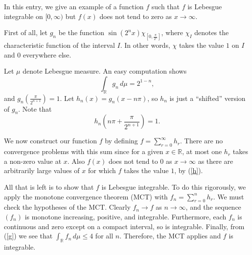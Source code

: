 \documentclass[12pt]{article}
\begin{document}

In this entry, we give an example of a function $f$ such that $f$ is Lebesgue integrable on $[0, \infty)$ but $f(x)$ does not tend to zero as $x \rightarrow \infty$.

First of all, let $g_n$ be the function $\displaystyle \sin (2^n x) \chi _{[0, \frac{\pi}{2^n}]}$, where $\chi _I$ denotes the characteristic function of the interval $I$.  In other words, $\chi$ takes the value $1$ on $I$ and 0 everywhere else.

Let $\mu$ denote Lebesgue measure.  An easy computation shows \begin{equation} \label{g} \int_{\mathbb{R}} g_n \, d\mu= 2^{1-n},\end{equation} and $\displaystyle g_n \left( \frac{\pi}{2^{n+1}} \right) = 1$.  Let $h_n (x) = g_n ( x-n \pi)$, so $h_n$ is just a ``shifted'' version of $g_n$.  Note that \begin{equation} \label{h} h_n \left( n \pi + \frac{\pi}{2^{n+1}} \right) = 1. \end{equation}

We now construct our function $f$ by defining $\displaystyle f = \sum _{r=0} ^\infty h_r $.  There are no convergence problems with this sum since for a given $x \in \mathbb{R}$, at most one $h_r$ takes a non-zero value at $x$.  Also $f(x)$ does not tend to 0 as $x \rightarrow \infty$ as there are arbitrarily large values of $x$ for which $f$ takes the value $1$, by (\ref{h}).

All that is left is to show that $f$ is Lebesgue integrable.  To do this rigorously, we apply the monotone convergence theorem (MCT) with $\displaystyle f_n = \sum _{r=0} ^n h_r$.  We must check the hypotheses of the MCT.  Clearly $f_n \rightarrow f$ as $n \rightarrow \infty$, and the sequence $(f_n)$ is monotone increasing, positive, and integrable.  Furthermore, each $f_n$ is continuous and zero except on a compact interval, so is integrable.  Finally, from (\ref{g}) we see that $\displaystyle \int_{\mathbb{R}} f_n \, d\mu \leq 4$ for all $n$.  Therefore, the MCT applies and $f$ is integrable.
\end{document}
